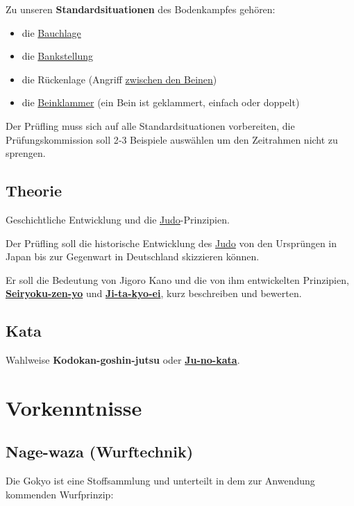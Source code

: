 \documentclass[justified, a4paper, notitlepage, captions=tableheading, nobib]{tufte-handout}
\begin{document}
Zu unseren \textbf{Standardsituationen} des Bodenkampfes gehören:
\begin{itemize}
\item die \hyperref[org69c958b]{Bauchlage}
\item die \hyperref[org9811981]{Bankstellung}
\item die Rückenlage (Angriff \hyperref[orge217f65]{zwischen den Beinen})
\item die \hyperref[org5e254da]{Beinklammer} (ein Bein ist geklammert, einfach oder doppelt)
\end{itemize}

Der Prüfling muss sich auf alle Standardsituationen vorbereiten, die Prüfungskommission soll 2‐3 Beispiele auswählen um den Zeitrahmen nicht zu sprengen.

\subsection{Theorie}
\label{sec:orga28ea8f}
Geschichtliche Entwicklung und die \hyperref[org80c3996]{Judo}-Prinzipien.

Der Prüfling soll die historische Entwicklung des \hyperref[org80c3996]{Judo} von den Ursprüngen in Japan bis zur Gegenwart in Deutschland skizzieren können.

Er soll die Bedeutung von Jigoro Kano und die von ihm entwickelten Prinzipien, \textbf{\hyperref[orgd0a8e14]{Seiryoku-zen-yo}} und \textbf{\hyperref[orga25107b]{Ji-ta-kyo-ei}}, kurz beschreiben und bewerten.

\subsection{Kata}
\label{sec:org811b0f4}
Wahlweise \textbf{Kodokan-goshin-jutsu} oder \textbf{\hyperref[org1f25ea6]{Ju-no-kata}}.


\newpage
\section{Vorkenntnisse }
\label{sec:org879fdf0}

\subsection{Nage-waza (Wurftechnik)}
\label{sec:orgf3c88b6}

Die Gokyo ist eine Stoffsammlung und unterteilt in dem zur Anwendung kommenden Wurfprinzip:
\end{document}
